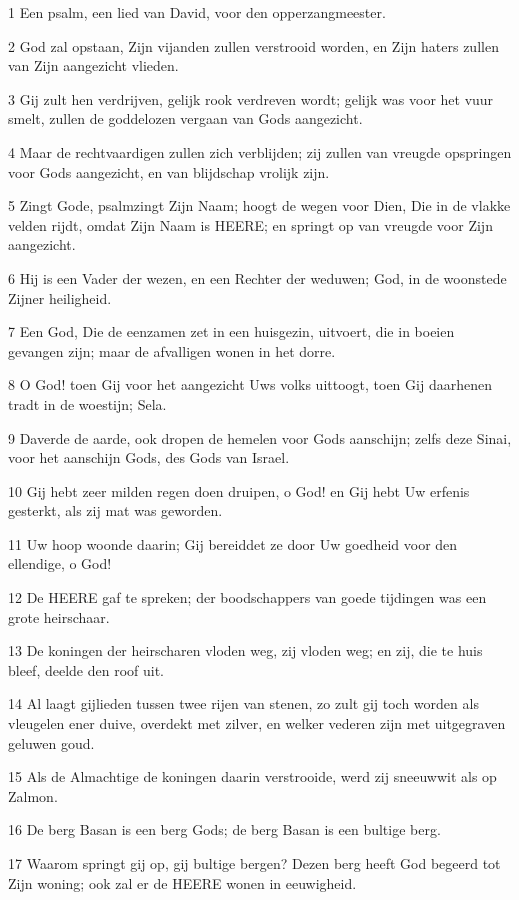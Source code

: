 \par 1 Een psalm, een lied van David, voor den opperzangmeester.
\par 2 God zal opstaan, Zijn vijanden zullen verstrooid worden, en Zijn haters zullen van Zijn aangezicht vlieden.
\par 3 Gij zult hen verdrijven, gelijk rook verdreven wordt; gelijk was voor het vuur smelt, zullen de goddelozen vergaan van Gods aangezicht.
\par 4 Maar de rechtvaardigen zullen zich verblijden; zij zullen van vreugde opspringen voor Gods aangezicht, en van blijdschap vrolijk zijn.
\par 5 Zingt Gode, psalmzingt Zijn Naam; hoogt de wegen voor Dien, Die in de vlakke velden rijdt, omdat Zijn Naam is HEERE; en springt op van vreugde voor Zijn aangezicht.
\par 6 Hij is een Vader der wezen, en een Rechter der weduwen; God, in de woonstede Zijner heiligheid.
\par 7 Een God, Die de eenzamen zet in een huisgezin, uitvoert, die in boeien gevangen zijn; maar de afvalligen wonen in het dorre.
\par 8 O God! toen Gij voor het aangezicht Uws volks uittoogt, toen Gij daarhenen tradt in de woestijn; Sela.
\par 9 Daverde de aarde, ook dropen de hemelen voor Gods aanschijn; zelfs deze Sinai, voor het aanschijn Gods, des Gods van Israel.
\par 10 Gij hebt zeer milden regen doen druipen, o God! en Gij hebt Uw erfenis gesterkt, als zij mat was geworden.
\par 11 Uw hoop woonde daarin; Gij bereiddet ze door Uw goedheid voor den ellendige, o God!
\par 12 De HEERE gaf te spreken; der boodschappers van goede tijdingen was een grote heirschaar.
\par 13 De koningen der heirscharen vloden weg, zij vloden weg; en zij, die te huis bleef, deelde den roof uit.
\par 14 Al laagt gijlieden tussen twee rijen van stenen, zo zult gij toch worden als vleugelen ener duive, overdekt met zilver, en welker vederen zijn met uitgegraven geluwen goud.
\par 15 Als de Almachtige de koningen daarin verstrooide, werd zij sneeuwwit als op Zalmon.
\par 16 De berg Basan is een berg Gods; de berg Basan is een bultige berg.
\par 17 Waarom springt gij op, gij bultige bergen? Dezen berg heeft God begeerd tot Zijn woning; ook zal er de HEERE wonen in eeuwigheid.
